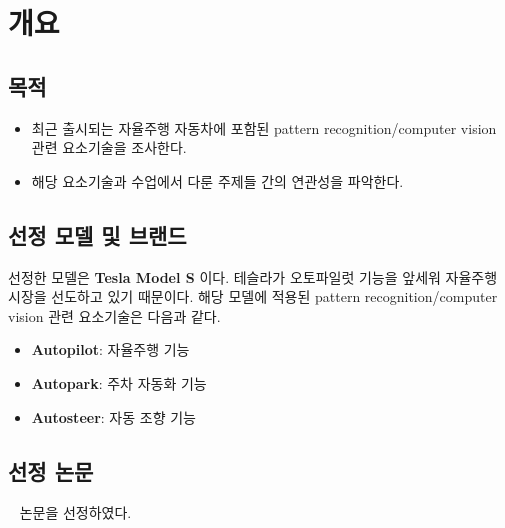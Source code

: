 \section{개요}{\label{sec:intro}}

\subsection{목적}
\begin{itemize}\tightlist
    \item 최근 출시되는 자율주행 자동차에 포함된 pattern recognition/computer vision 관련 요소기술을 조사한다.
    \item 해당 요소기술과 수업에서 다룬 주제들 간의 연관성을 파악한다.
\end{itemize}

\subsection{선정 모델 및 브랜드}
선정한 모델은 \textbf{Tesla Model S} 이다.
테슬라가 오토파일럿 기능을 앞세워 자율주행 시장을 선도하고 있기 때문이다.
해당 모델에 적용된 pattern recognition/computer vision 관련 요소기술은 다음과 같다.
\begin{itemize}\tightlist
    \item \textbf{Autopilot}: 자율주행 기능
    \item \textbf{Autopark}: 주차 자동화 기능
    \item \textbf{Autosteer}: 자동 조향 기능
\end{itemize}

\subsection{선정 논문}
~\cite{DBLP:journals/corr/abs-2104-09224} 논문을 선정하였다.
